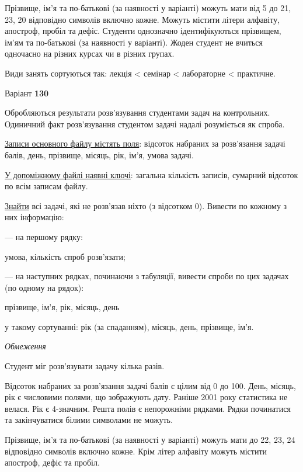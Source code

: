 \documentclass[11pt, ukrainian]{article}
\begin{document}
Прізвище, ім’я та по-батькові (за наявності у варіанті)
можуть мати від 5 до 21, 23, 20 відповідно символів включно кожне.
Можуть містити літери алфавіту, апостроф, пробіл та дефіс.
Студенти однозначно ідентифікуються прізвищем, ім’ям та по-батькові (за наявності у варіанті).
Жоден студент не вчиться одночасно на різних курсах чи в різних групах.

Види занять сортуються так: лекція < семінар < лабораторне < практичне.





\par
\newpage
{\center Варіант  \No \textbf { 130 }\par}
\bigskip
Обробляються результати розв’язування студентами задач на контрольних.
Одиничний факт роз\-в’я\-зу\-вання студентом задачі надалі розуміється як спроба.

\underline{Записи основного файлу містять поля}: відсоток набраних за розв’язання задачі балів, день, прізвище, місяць, рік, ім’я, умова задачі.

\underline{У допоміжному файлі наявні ключі}: загальна кількість записів, сумарний відсоток по всім записам файлу.

\underline{Знайти} всі задачі, які не розв’язав ніхто (з відсотком 0). Вивести по кожному з них інформацію:\par
{\noindent}--- на першому рядку:\par
умова, кількість спроб розв’язати;

{\noindent}--- на наступних рядках, починаючи з табуляції, вивести спроби по цих задачах (по одному на рядок):\par
прізвище, ім’я, рік, місяць, день

{\noindent}у такому сортуванні: рік (за спаданням), місяць, день, прізвище, ім’я.


\bigskip\textit{Обмеження}

Студент міг розв’язувати задачу кілька разів.

Відсоток набраних за розв’язання задачі балів є цілим від 0 до 100.
День, місяць, рік є числовими полями, що зображують дату.
Раніше 2001 року статистика не велася. Рік є 4-значним.
Решта полів є непорожніми рядками.
Рядки починатися та закінчуватися білими символами не можуть.

Прізвище, ім’я та по-батькові (за наявності у варіанті) можуть мати до 22, 23, 24 відповідно символів включно кожне. 
Крім літер алфавіту можуть містити апостроф, дефіс та пробіл.
\end{document}
